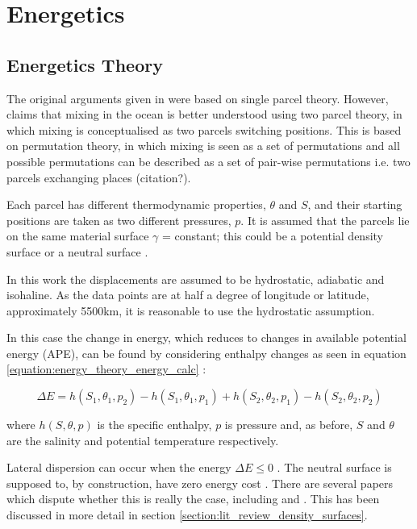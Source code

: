 \section{Energetics}
\label{section:energetics}

\subsection{Energetics Theory}
\label{subsection:energeticstheory}

The original arguments given in \citet{McDougall1987} were based on single parcel theory. However, \citet{Tailleux2016} claims that mixing in the ocean is better understood using two parcel theory, in which mixing is conceptualised as two parcels switching positions. This is based on permutation theory, in which mixing is seen as a set of permutations and all possible permutations can be described as a set of pair-wise permutations i.e. two parcels exchanging places (citation?).  

Each parcel has different thermodynamic properties, $\theta$ and $S$, and their starting positions are taken as two different pressures, $p$. It is assumed that the parcels lie on the same material surface $\gamma$ = constant; this could be a potential density surface or a neutral surface \citep{Tailleux2016}.

In this work the displacements are assumed to be hydrostatic, adiabatic and isohaline. As the data points are at half a degree of longitude or latitude, approximately 5500km, it is reasonable to use the hydrostatic assumption. 

In this case the change in energy, which reduces to changes in available potential energy (APE), can be found by considering enthalpy changes as seen in equation \ref{equation:energy_theory_energy_calc} \citep{Tailleux2016}:


\begin{equation}
    \Delta E = h(S_1, \theta_1, p_2) - h(S_1, \theta_1, p_1) +h(S_2, \theta_2, p_1) - h(S_2, \theta_2, p_2)
    \label{equation:energy_theory_energy_calc}
\end{equation}

where $h(S, \theta, p)$ is the specific enthalpy, $p$ is pressure and, as before, $S$ and $\theta$ are the salinity and potential temperature respectively.

Lateral dispersion can occur when the energy $\Delta E\leq 0$  \citep{Tailleux2016}. The neutral surface is supposed to, by construction, have zero energy cost \citet{McDougall1987}. There are several papers which dispute whether this is really the case, including \citet{Tailleux2016} and \citet{Nycander2011}. This has been discussed in more detail in section \ref{section:lit_review_density_surfaces}.

